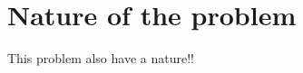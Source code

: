 \section{Nature of the problem}
\label{sec:NatureOfTheProblem}
This problem also have a nature!!




